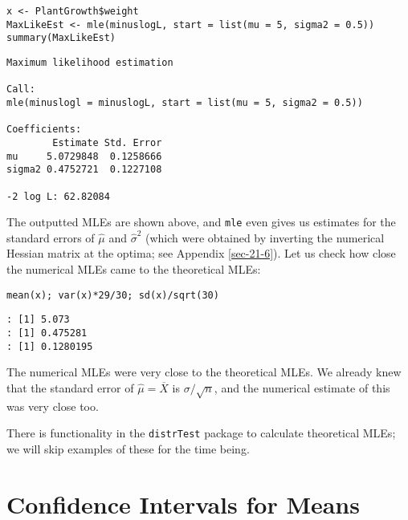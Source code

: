 \begin{verbatim}
x <- PlantGrowth$weight
MaxLikeEst <- mle(minuslogL, start = list(mu = 5, sigma2 = 0.5))
summary(MaxLikeEst)
\end{verbatim}

\begin{verbatim}
Maximum likelihood estimation

Call:
mle(minuslogl = minuslogL, start = list(mu = 5, sigma2 = 0.5))

Coefficients:
        Estimate Std. Error
mu     5.0729848  0.1258666
sigma2 0.4752721  0.1227108

-2 log L: 62.82084
\end{verbatim}

The outputted MLEs are shown above, and \texttt{mle} even gives us estimates
for the standard errors of \(\hat{\mu}\) and \(\hat{\sigma}^{2}\)
(which were obtained by inverting the numerical Hessian matrix at the
optima; see Appendix \ref{sec-21-6}). Let us check how close
the numerical MLEs came to the theoretical MLEs:

\begin{verbatim}
mean(x); var(x)*29/30; sd(x)/sqrt(30)
\end{verbatim}

\begin{verbatim}
: [1] 5.073
: [1] 0.475281
: [1] 0.1280195
\end{verbatim}

The numerical MLEs were very close to the theoretical MLEs. We already
knew that the standard error of \(\hat{\mu}=\overline{X}\) is
\(\sigma/\sqrt{n}\), and the numerical estimate of this was very close
too.



There is functionality in the \texttt{distrTest} package \cite{distrTest} to
calculate theoretical MLEs; we will skip examples of these for the
time being.

\section{Confidence Intervals for Means}
\label{sec-9-2}

